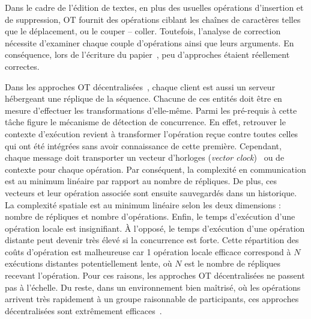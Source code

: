 Dans le cadre de l'édition de textes, en plus des usuelles opérations
d'insertion et de suppression, OT fournit des opérations ciblant les chaînes de
caractères telles que le déplacement, ou le couper -- coller. Toutefois,
l'analyse de correction nécessite d'examiner chaque couple d'opérations ainsi
que leurs arguments. En conséquence, lors de l'écriture du
papier~\cite{imine2003proving}, peu d'approches étaient réellement
correctes. 

Dans les approches OT décentralisées~\cite{sun2009contextbased}, chaque client
est aussi un serveur hébergeant une réplique de la séquence. Chacune de ces
entités doit être en mesure d'effectuer les transformations d'elle-même. Parmi
les pré-requis à cette tâche figure le mécanisme de détection de concurrence. En
effet, retrouver le contexte d'exécution revient à transformer l'opération reçue
contre toutes celles qui ont été intégrées sans avoir connaissance de cette
première. Cependant, chaque message doit transporter un vecteur d'horloges
(\emph{vector clock})~\cite{lamport1978time} ou de contexte pour chaque
opération. Par conséquent, la complexité en communication est au minimum
linéaire par rapport au nombre de répliques. De plus, ces vecteurs et leur
opération associée sont ensuite sauvegardés dans un historique. La complexité
spatiale est au minimum linéaire selon les deux dimensions : nombre de répliques
et nombre d'opérations. Enfin, le temps d'exécution d'une opération locale est
insignifiant. À l'opposé, le temps d'exécution d'une opération distante peut
devenir très élevé si la concurrence est forte. Cette répartition des coûts
d'opération est malheureuse car 1 opération locale efficace correspond à $N$
exécutions distantes potentiellement lente, où $N$ est le nombre de répliques
recevant l'opération. Pour ces raisons, les approches OT décentralisées ne
passent pas à l'échelle. Du reste, dans un environnement bien maîtrisé, où les
opérations arrivent très rapidement à un groupe raisonnable de participants, ces
approches décentralisées sont extrêmement efficaces~\cite{mehdi2014merging}.


